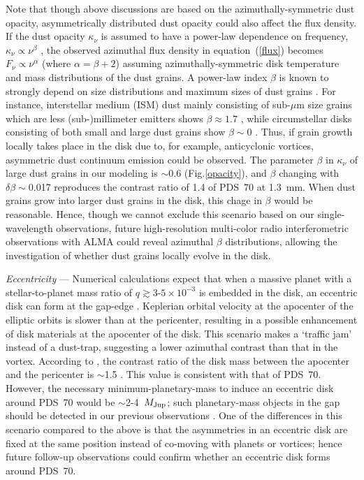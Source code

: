\documentclass[apj]{emulateapj-rtx4}
\begin{document}
  Note that though above discussions are based on the azimuthally-symmetric dust opacity, 
  asymmetrically distributed dust opacity could also affect the flux density. If the dust opacity $\kappa_{\nu}$ 
  is assumed to have a power-law dependence on frequency, $\kappa_{\nu} \propto \nu^{\beta}$ \citep{beck90,beck91}, 
  the observed azimuthal flux density in equation~(\ref{flux}) becomes $F_{\nu} \propto \nu^{\alpha}$ 
  (where $\alpha = \beta + 2$) assuming azimuthally-symmetric disk temperature and mass distributions of the dust grains. A power-law 
  index $\beta$ is known to strongly depend on size distributions and maximum sizes of dust grains \citep{drai06}. For instance, 
  interstellar medium (ISM) dust mainly consisting of sub-$\mu$m size grains which are less (sub-)millimeter emitters shows 
  $\beta \approx 1.7$ \citep[e.g.,][]{li01}, while circumstellar disks consisting of both small and large dust grains show 
  $\beta \sim 0$ \citep[e.g.,][]{andr07}. Thus, if grain growth locally takes place in the disk due to, for example, anticyclonic 
  vortices, asymmetric dust continuum emission could be observed. The parameter $\beta$ in $\kappa_{\nu}$ 
  of large dust grains in our modeling is 
  $\sim$0.6 (Fig.\ref{opacity}), and $\beta$ changing with $\delta \beta \sim$0.017 
  reproduces the contrast ratio of 1.4 of PDS~70 at 1.3~mm.
  When dust grains grow into larger dust grains in the disk, this chage in $\beta$  
  would be reasonable. Hence, though we 
  cannot exclude this scenario based on our single-wavelength observations, future high-resolution multi-color radio 
  interferometric observations with ALMA 
  could reveal azimuthal $\beta$ distributions, allowing the investigation of whether dust grains locally evolve in the disk.

  {\it Eccentricity} ---
  Numerical calculations expect that when a massive planet with a stellar-to-planet mass ratio of $q \gtrsim 3$-$5\times10^{-3}$ is 
  embedded in the disk, an eccentric disk can form at the gap-edge 
  \citep[eccentricity of up to $\sim$0.25;][]{kley06,atai13,rega14}. 
  Keplerian orbital velocity at the 
  apocenter of the elliptic orbits is slower than at the pericenter, resulting in a possible enhancement of disk materials at the 
  apocenter of the disk. This scenario makes a `traffic jam' instead of a dust-trap, suggesting a lower azimuthal contrast than 
  that in the vortex. According to \citet{atai13}, the contrast ratio of the disk mass between the apocenter and the pericenter is 
  $\sim$1.5 \citep[see Fig.~3 in][]{atai13}. This value is consistent 
  with that of PDS~70. However, the necessary 
  minimum-planetary-mass to induce an eccentric disk around PDS~70 would be $\sim$2-4~$M_{\rm Jup}$; such planetary-mass objects
  in the gap should be detected in our previous observations \citep[see Fig.~2f in][]{hash12}.
  One of the differences in this scenario compared to the above is 
  that the asymmetries in an eccentric disk are fixed at the same position instead of co-moving with planets or 
  vortices; hence future follow-up observations could confirm whether an eccentric disk forms around PDS~70.
\end{document}
